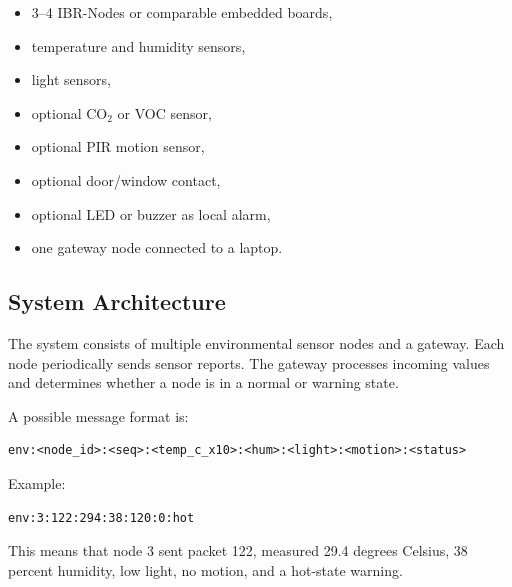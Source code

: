 \documentclass[11pt,a4paper]{article}
\newcommand{\projecttitle}[1]{\subsection*{#1}}
\begin{document}
\begin{itemize}
    \item 3--4 IBR-Nodes or comparable embedded boards,
    \item temperature and humidity sensors,
    \item light sensors,
    \item optional CO$_2$ or VOC sensor,
    \item optional PIR motion sensor,
    \item optional door/window contact,
    \item optional LED or buzzer as local alarm,
    \item one gateway node connected to a laptop.
\end{itemize}

\projecttitle{System Architecture}

The system consists of multiple environmental sensor nodes and a gateway. Each node periodically sends sensor reports. The gateway processes incoming values and determines whether a node is in a normal or warning state.

A possible message format is:

\begin{verbatim}
env:<node_id>:<seq>:<temp_c_x10>:<hum>:<light>:<motion>:<status>
\end{verbatim}

Example:

\begin{verbatim}
env:3:122:294:38:120:0:hot
\end{verbatim}

This means that node 3 sent packet 122, measured 29.4 degrees Celsius, 38 percent humidity, low light, no motion, and a hot-state warning.
\end{document}

